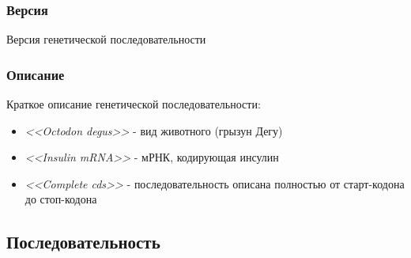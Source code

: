 \documentclass{article}
\begin{document}
                \subsubsection{Версия}
                    Версия генетической последовательности
                \subsubsection{Описание}
                    Краткое описание генетической последовательности:
                    \begin{itemize}
                      \item \emph{<<Octodon degus>>} - вид животного (грызун Дегу)
                      \item \emph{<<Insulin mRNA>>} - мРНК, кодирующая инсулин
                      \item \emph{<<Complete cds>>} - последовательность описана полностью от старт-кодона до стоп-кодона
                    \end{itemize}
            \subsection{Последовательность}    
\end{document}
